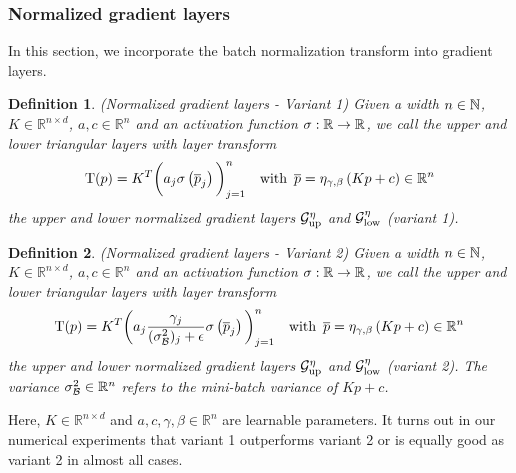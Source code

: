 \documentclass[twoside,a4paper]{article}
\newtheorem{definition}{Definition}
\begin{document}
\subsubsection{Normalized gradient layers}

In this section, we incorporate the batch normalization transform into gradient layers.

\begin{definition}\label{def_norm_gradient_layers_1}
	(Normalized gradient layers - Variant 1)
	Given a width $n \in \mathbb{N}$, $K \in \mathbb{R}^{n \times d}$, $a,c \in \mathbb{R}^n$ and
	an activation function $\sigma : \mathbb{R} \to \mathbb{R}$,
	we call the upper and lower triangular layers with layer transform
	\begin{equation*}
		\mathrm{T}(p) = K^T \bigg( a_j \sigma
		\left( \overline{p}_j \right) \bigg)_{j=1}^n
		\quad \text{with } \, \overline{p} = \eta_{\gamma, \beta} \left( Kp + c \right) \in \mathbb{R}^n
	\end{equation*}
	the upper and lower normalized gradient layers 
	$\mathcal{G}_{\text{up}}^{\eta}$ and $\mathcal{G}_{\text{low}}^{\eta}$ (variant 1).
\end{definition}

\begin{definition}\label{def_norm_gradient_layers_2}
	(Normalized gradient layers - Variant 2)
	Given a width $n \in \mathbb{N}$, $K \in \mathbb{R}^{n \times d}$, $a,c \in \mathbb{R}^n$ and
	an activation function $\sigma : \mathbb{R} \to \mathbb{R}$,
	we call the upper and lower triangular layers with layer transform
	\begin{equation*}
		\mathrm{T}(p) = K^T \bigg( a_j \frac{\gamma_j}{(\sigma^2_\mathcal{B})_j + \epsilon}
		\sigma \left( \overline{p}_j \right) \bigg)_{j=1}^n
		\quad \text{with } \, \overline{p} = \eta_{\gamma, \beta} \left( Kp + c \right) \in \mathbb{R}^n
	\end{equation*}
	the upper and lower normalized gradient layers 
	$\mathcal{G}_{\text{up}}^{\eta}$ and $\mathcal{G}_{\text{low}}^{\eta}$ (variant 2).
	The variance $\sigma^2_\mathcal{B} \in \mathbb{R}^n$ refers to the mini-batch variance of $Kp+c$.
\end{definition}

Here, $K \in \mathbb{R}^{n \times d}$ and $a,c, \gamma, \beta \in \mathbb{R}^n$
are learnable parameters.
It turns out in our numerical experiments that variant 1 outperforms
variant 2 or is equally good as variant 2 in almost all cases.
\end{document}
